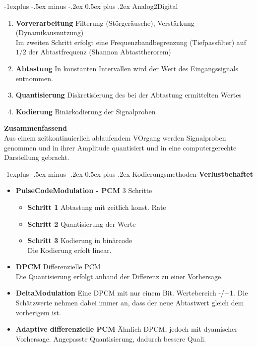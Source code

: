 \documentclass[10pt,landscape]{article}
\makeatletter
\renewcommand{\subsection}{\@startsection{subsection}{2}{0mm}%
                                {-1explus -.5ex minus -.2ex}%
                                {0.5ex plus .2ex}%
                                {\normalfont\normalsize\bfseries}}
\makeatother
\begin{document}
\begin{multicols}{3}
\subsection{Analog2Digital}
\begin{enumerate}
    \item \textbf{Vorverarbeitung} Filterung (St\"orger\"ausche), Verst\"arkung (Dynamikausnutzung) \\
    Im zweiten Schritt erfolgt eine Frequenzbandbegrenzung (Tiefpassfilter) auf $1/2$ der Abtastfrequenz (Shannon Abtasttherorem)
    \item \textbf{Abtastung} In konstanten Intervallen wird der Wert des Eingangssignals entnommen.
    \item \textbf{Quantisierung} Diskretisierung des bei der Abtastung ermittelten Wertes 
    \item \textbf{Kodierung} Bin\"arkodierung der Signalproben
\end{enumerate}
\textbf{Zusammenfassend} \\
Aus einem zeitkontinuierlich ablaufendem VOrgang werden Signalproben genommen und in ihrer Amplitude quantisiert und in eine computergerechte Darstellung gebracht.

\subsection{Kodierungsmethoden}
\textbf{Verlustbehaftet}
\begin{itemize}
    \item \textbf{PulseCodeModulation - PCM} 3 Schritte \\
        \begin{itemize}
        \item \textbf{Schritt 1} Abtastung mit zeitlich konst. Rate
        \item \textbf{Schritt 2} Quantisierung der Werte
        \item \textbf{Schritt 3} Kodierung in bin\"arcode \\
            Die Kodierung erfolt linear. 
        \end{itemize}
    \item \textbf{DPCM} Differenzielle PCM \\
        Die Quantisierung erfolgt anhand der Differenz zu einer Vorhersage.
    \item \textbf{DeltaModulation} Eine DPCM mit nur einem Bit. Wertebereich -/+1.
    Die Sch\"atzwerte nehmen dabei immer an, dass der neue Abtastwert gleich dem vorherigem ist.
    \item \textbf{Adaptive differenzielle PCM} \"Ahnlich DPCM, jedoch mit dyamischer Vorhersage.
     Angepasste Quantisierung, dadurch bessere Quali.
\end{itemize}

\end{multicols}
\end{document}
